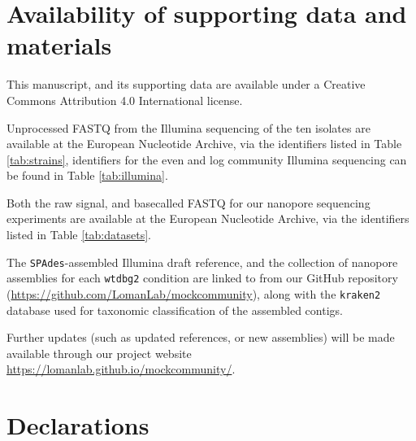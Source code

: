 \documentclass[a4paper,num-refs]{oup-contemporary}
\begin{document}
\section{Availability of supporting data and materials}
This manuscript, and its supporting data are available under a Creative Commons Attribution 4.0 International license.

Unprocessed FASTQ from the Illumina sequencing of the ten isolates are available at the European Nucleotide Archive, via the identifiers listed in Table \ref{tab:strains}, identifiers for the even and log community Illumina sequencing can be found in Table \ref{tab:illumina}.


Both the raw signal, and basecalled FASTQ for our nanopore sequencing experiments are available at the European Nucleotide Archive, via the identifiers listed in Table \ref{tab:datasets}.

The \texttt{SPAdes}-assembled Illumina draft reference, and the collection of nanopore assemblies for each \texttt{wtdbg2} condition are linked to from our GitHub repository (\url{https://github.com/LomanLab/mockcommunity}), along with the \texttt{kraken2} database used for taxonomic classification of the assembled contigs.


Further updates (such as updated references, or new assemblies) will be made available through our project website \url{https://lomanlab.github.io/mockcommunity/}.



\section{Declarations}

\end{document}

